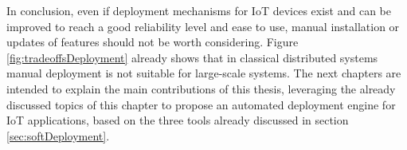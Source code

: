 In conclusion, even if deployment mechanisms for IoT devices exist and can be improved to reach a good reliability level and ease to use, manual installation or updates of features should not be worth considering.
Figure \ref{fig:tradeoffsDeployment} already shows that in classical distributed systems manual deployment is not suitable for large-scale systems.
The next chapters are intended to explain the main contributions of this thesis, leveraging the already discussed topics of this chapter to propose an automated deployment engine for IoT applications, based on the three tools already discussed in section \ref{sec:softDeployment}.